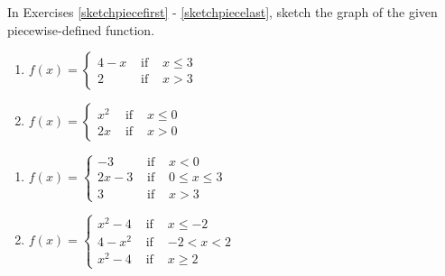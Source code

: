 In Exercises \ref{sketchpiecefirst} - \ref{sketchpiecelast}, sketch the graph of the given piecewise-defined function.

\begin{multicols}{2}
\begin{enumerate}
\setcounter{enumi}{\value{HW}}

\item ${\displaystyle f(x) = \left\{ \begin{array}{rcl} 4-x & \mbox{ if } &  x \leq 3 \\
                                                            2 & \mbox{ if } & x > 3 
                                     \end{array} \right. }$ \label{sketchpiecefirst}

\item ${\displaystyle f(x) = \left\{ \begin{array}{rcl} x^2 & \mbox{ if } & x \leq 0 \\
                                                     2x & \mbox{ if } & x > 0
                                  \end{array} \right. }$

\setcounter{HW}{\value{enumi}}
\end{enumerate}
\end{multicols}


\begin{multicols}{2}
\begin{enumerate}
\setcounter{enumi}{\value{HW}}

\item ${\displaystyle f(x) = \left\{ \begin{array}{rcl}  -3 & \mbox{ if } & x < 0 \\
                                                        2x-3 & \mbox{ if } & 0 \leq x \leq 3 \\
                                                            3 & \mbox{ if } & x > 3  
                                     \end{array} \right. }$

\item ${\displaystyle f(x) = \left\{ \begin{array}{rcl} x^2 - 4 & \mbox{ if } &x \leq -2\\
                                                                  4-x^2 & \mbox{ if } & -2 < x < 2 \\
                                                         x^2-4 & \mbox{ if } & x \geq 2 
                                     \end{array} \right. }$


\setcounter{HW}{\value{enumi}}
\end{enumerate}
\end{multicols}


